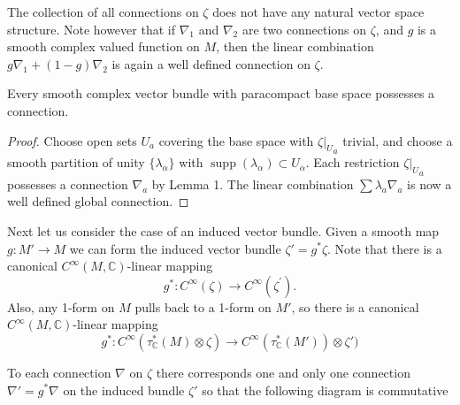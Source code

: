 \documentclass[../main]{subfiles}
\begin{document}
The collection of all connections on $\zeta$ does not have any natural vector space structure. Note however that if $\nabla_{1}$ and $\nabla_{2}$ are two connections on $\zeta$, and $g$ is a smooth complex valued function on $M$, then the linear combination \newline $g \nabla_{1}+(1-g) \nabla_{2}$ is again a well defined connection on $\zeta$.

\begin{lemma}
Every smooth complex vector bundle with paracompact base space possesses a connection.
\end{lemma}

\begin{proof}
Choose open sets $U_{a}$ covering the base space with $\zeta {|_U}_a$ trivial, and choose a smooth partition of unity $\{\lambda_{\alpha}\}$ with $\operatorname{supp}(\lambda_{\alpha}) \subset U_{\alpha}$. Each restriction $\zeta {|_U}_{a}$ possesses a connection $\nabla_{a}$ by Lemma 1. The linear combination $\sum \lambda_{a} \nabla_{a}$ is now a well defined global connection.
\end{proof}

Next let us consider the case of an induced vector bundle. Given a smooth map $g:M' \rightarrow M$ we can form the induced vector bundle $\zeta'=g^{*} \zeta$. Note that there is a canonical $C^\infty (M, \mathbb{C})$-linear mapping
\[
g^{*}: C^\infty (\zeta) \rightarrow C^\infty (\zeta^{'}) .
\]
Also, any 1-form on $M$ pulls back to a 1-form on $M'$, so there is a canonical $C^\infty (M, \mathbb{C})$-linear mapping
\[
g^{*}: C^\infty (\tau_{\mathbb{C}}^{*}(M) \otimes \zeta) \rightarrow C^\infty (\tau^{*}_\mathbb{C}(M')) \otimes \zeta')
\]

\begin{lemma}
To each connection $\nabla$ on $\zeta$ there corresponds one and only one connection $\nabla '= g^{*} \nabla$ on the induced bundle $\zeta '$ so that the following diagram is commutative

\begin{center}
\end{center}
\end{lemma}
\end{document}
